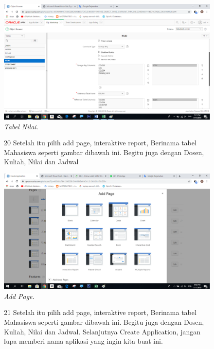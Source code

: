 \begin{enumerate}
\begin{figure}
    \begin{center}
    \includegraphics[scale=0.4]{figures/22.png}
    \caption{\textit{Tabel Nilai.}}
    \end{center}
    \label{gambar}
    \end{figure}

\begin{figure}
\item[20] Setelah itu pilih add page, interaktive report, Berinama tabel Mahasiswa seperti gambar dibawah ini. Begitu juga dengan Dosen, Kuliah, Nilai dan Jadwal

    \begin{center}
    \includegraphics[scale=0.4]{figures/24.png}
    \caption{\textit{Add Page.}}
    \end{center}
    \label{gambar}
    \end{figure}    

\begin{figure}
\item[21] Setelah itu pilih add page, interaktive report, Berinama tabel Mahasiswa seperti gambar dibawah ini. Begitu juga dengan Dosen, Kuliah, Nilai dan Jadwal. Selanjutnya Create Application, jangan lupa memberi nama aplikasi yang ingin kita buat ini.


\end{figure}
\end{enumerate}
